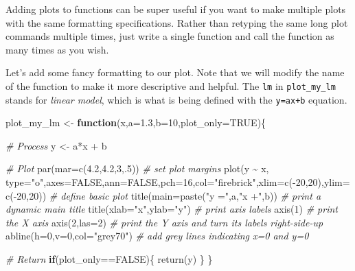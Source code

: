 \documentclass[
]{book}
\newenvironment{Shaded}{\begin{snugshade}}{\end{snugshade}}
\newcommand{\AttributeTok}[1]{\textcolor[rgb]{0.77,0.63,0.00}{#1}}
\newcommand{\CommentTok}[1]{\textcolor[rgb]{0.56,0.35,0.01}{\textit{#1}}}
\newcommand{\ConstantTok}[1]{\textcolor[rgb]{0.00,0.00,0.00}{#1}}
\newcommand{\ControlFlowTok}[1]{\textcolor[rgb]{0.13,0.29,0.53}{\textbf{#1}}}
\newcommand{\DecValTok}[1]{\textcolor[rgb]{0.00,0.00,0.81}{#1}}
\newcommand{\FloatTok}[1]{\textcolor[rgb]{0.00,0.00,0.81}{#1}}
\newcommand{\FunctionTok}[1]{\textcolor[rgb]{0.00,0.00,0.00}{#1}}
\newcommand{\NormalTok}[1]{#1}
\newcommand{\OtherTok}[1]{\textcolor[rgb]{0.56,0.35,0.01}{#1}}
\newcommand{\SpecialCharTok}[1]{\textcolor[rgb]{0.00,0.00,0.00}{#1}}
\newcommand{\StringTok}[1]{\textcolor[rgb]{0.31,0.60,0.02}{#1}}
\begin{document}
Adding plots to functions can be super useful if you want to make multiple plots with the same formatting specifications. Rather than retyping the same long plot commands multiple times, just write a single function and call the function as many times as you wish.

Let's add some fancy formatting to our plot. Note that we will modify the name of the function to make it more descriptive and helpful. The \texttt{lm} in \texttt{plot\_my\_lm} stands for \emph{linear model}, which is what is being defined with the \texttt{y=ax+b} equation.

\begin{Shaded}
\begin{Highlighting}[]
\NormalTok{plot\_my\_lm }\OtherTok{\textless{}{-}} \ControlFlowTok{function}\NormalTok{(x,}\AttributeTok{a=}\FloatTok{1.3}\NormalTok{,}\AttributeTok{b=}\DecValTok{10}\NormalTok{,}\AttributeTok{plot\_only=}\ConstantTok{TRUE}\NormalTok{)\{}
  
  \CommentTok{\# Process}
\NormalTok{  y }\OtherTok{\textless{}{-}}\NormalTok{ a}\SpecialCharTok{*}\NormalTok{x }\SpecialCharTok{+}\NormalTok{ b}
  
  \CommentTok{\# Plot}
  \FunctionTok{par}\NormalTok{(}\AttributeTok{mar=}\FunctionTok{c}\NormalTok{(}\FloatTok{4.2}\NormalTok{,}\FloatTok{4.2}\NormalTok{,}\DecValTok{3}\NormalTok{,.}\DecValTok{5}\NormalTok{)) }\CommentTok{\# set plot margins}
  \FunctionTok{plot}\NormalTok{(y }\SpecialCharTok{\textasciitilde{}}\NormalTok{ x, }\AttributeTok{type=}\StringTok{"o"}\NormalTok{,}\AttributeTok{axes=}\ConstantTok{FALSE}\NormalTok{,}\AttributeTok{ann=}\ConstantTok{FALSE}\NormalTok{,}\AttributeTok{pch=}\DecValTok{16}\NormalTok{,}\AttributeTok{col=}\StringTok{"firebrick"}\NormalTok{,}\AttributeTok{xlim=}\FunctionTok{c}\NormalTok{(}\SpecialCharTok{{-}}\DecValTok{20}\NormalTok{,}\DecValTok{20}\NormalTok{),}\AttributeTok{ylim=}\FunctionTok{c}\NormalTok{(}\SpecialCharTok{{-}}\DecValTok{20}\NormalTok{,}\DecValTok{20}\NormalTok{)) }\CommentTok{\# define basic plot}
  \FunctionTok{title}\NormalTok{(}\AttributeTok{main=}\FunctionTok{paste}\NormalTok{(}\StringTok{"y ="}\NormalTok{,a,}\StringTok{"x +"}\NormalTok{,b)) }\CommentTok{\# print a dynamic main title}
  \FunctionTok{title}\NormalTok{(}\AttributeTok{xlab=}\StringTok{"x"}\NormalTok{,}\AttributeTok{ylab=}\StringTok{"y"}\NormalTok{)  }\CommentTok{\# print axis labels}
  \FunctionTok{axis}\NormalTok{(}\DecValTok{1}\NormalTok{) }\CommentTok{\# print the X axis}
  \FunctionTok{axis}\NormalTok{(}\DecValTok{2}\NormalTok{,}\AttributeTok{las=}\DecValTok{2}\NormalTok{) }\CommentTok{\# print the Y axis and turn its labels right{-}side{-}up}
  \FunctionTok{abline}\NormalTok{(}\AttributeTok{h=}\DecValTok{0}\NormalTok{,}\AttributeTok{v=}\DecValTok{0}\NormalTok{,}\AttributeTok{col=}\StringTok{"grey70"}\NormalTok{) }\CommentTok{\# add grey lines indicating x=0 and y=0}
  
  \CommentTok{\# Return}
  \ControlFlowTok{if}\NormalTok{(plot\_only}\SpecialCharTok{==}\ConstantTok{FALSE}\NormalTok{)\{}
    \FunctionTok{return}\NormalTok{(y)}
\NormalTok{  \}}
\NormalTok{\}}
\end{Highlighting}
\end{Shaded}
\end{document}
